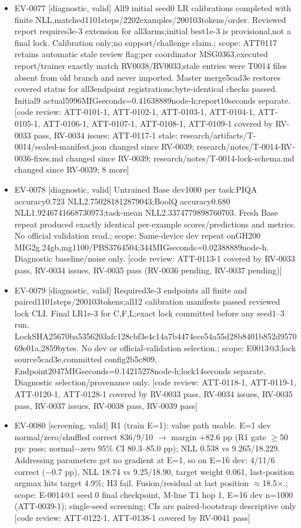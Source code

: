 \documentclass[11pt]{article}
\begin{document}
\begin{itemize}
\item EV-0077 [diagnostic, valid] All9 initial seed0 LR calibrations completed with finite NLL,matched1101steps/2202examples/200103tokens/order. Reviewed report requires3e-3 extension for all3arms;initial best1e-3 is provisional,not a final lock. Calibration only;no support/challenge claim.; scope: ATT0117 retains automatic stale review flag:per coordinator MSG0363,executed report/trainer exactly match RV0038/RV0033;stale entries were T0014 files absent from old branch and never imported. Master merge5cad3e restores covered status for all3endpoint registrations;byte-identical checks passed. Initial9 actual5996MIGseconds=0.41638889node-h;report10seconds separate. [code review: ATT-0101-1, ATT-0102-1, ATT-0103-1, ATT-0104-1, ATT-0105-1, ATT-0106-1, ATT-0107-1, ATT-0108-1, ATT-0109-1 covered by RV-0033 pass, RV-0034 issues; ATT-0117-1 stale: research/artifacts/T-0014/sealed-manifest.json changed since RV-0039; research/notes/T-0014-RV-0036-fixes.md changed since RV-0039; research/notes/T-0014-lock-schema.md changed since RV-0039; 8 more]
\item EV-0078 [diagnostic, valid] Untrained Base dev1000 per task:PIQA accuracy0.723 NLL2.750281812879043;BoolQ accuracy0.680 NLL1.9246741668730973;task-mean NLL2.3374779898760703. Fresh Base repeat produced exactly identical per-example scores/predictions and metrics. No official validation read.; scope: Same-device dev repeat onGH200 MIG2g.24gb,mg1100/PBS3764504;344MIGseconds=0.02388889node-h. Diagnostic baseline/noise only. [code review: ATT-0113-1 covered by RV-0033 pass, RV-0034 issues, RV-0035 pass (RV-0036 pending, RV-0037 pending)]
\item EV-0079 [diagnostic, valid] Required3e-3 endpoints all finite and paired1101steps/200103tokens;all12 calibration manifests passed reviewed lock CLI. Final LR1e-3 for C,F,L;exact lock committed before any seed1--3 run. LockSHA25670ba5356203afc128cbf3e4c14a7b4474ece54a55d28b8401b852d957069e01a,2859bytes. No dev or official-validation selection.; scope: E0013@3;lock source5cad3e,committed config2b5c809. Endpoint2047MIGseconds=0.14215278node-h;lock14seconds separate. Diagnostic selection/provenance only. [code review: ATT-0118-1, ATT-0119-1, ATT-0120-1, ATT-0128-1 covered by RV-0033 pass, RV-0034 issues, RV-0035 pass, RV-0037 issues, RV-0038 pass, RV-0039 pass]
\item EV-0080 [screening, valid] R1 (train E=1): value path usable. E=1 dev normal/zero/shuffled correct 836/9/10 \ensuremath{\rightarrow} margin +82.6 pp (R1 gate \ensuremath{\geq}50 pp: pass; normal\ensuremath{-}zero 95\% CI 80.3--85.0 pp); NLL 0.538 vs 9.265/18.229. Addressing parameters get no gradient at E=1, so on E=16 dev: 4/11/6 correct (\ensuremath{-}0.7 pp), NLL 18.74 vs 9.25/18.90, target weight 0.061, last-position argmax hits target 4.9\%; H3 fail. Fusion/residual at last position \ensuremath{\approx}18.5\ensuremath{\times}.; scope: E-0014@1 seed 0 final checkpoint, M-line T1 hop 1, E=16 dev n=1000 (ATT-0039-1); single-seed screening; CIs are paired-bootstrap descriptive only [code review: ATT-0122-1, ATT-0138-1 covered by RV-0041 pass]

\end{itemize}
\end{document}
